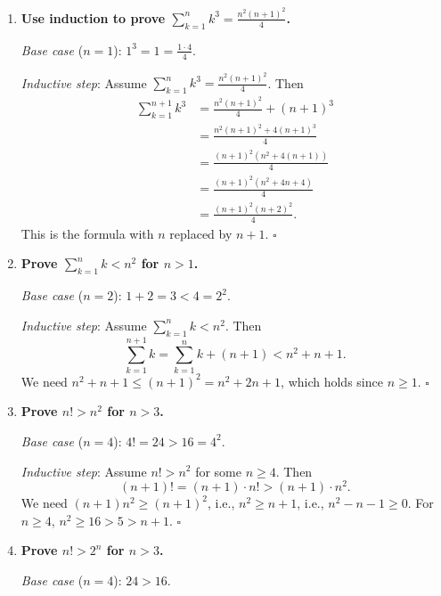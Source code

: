 \documentclass[11pt]{book}
\def\NN{\mathbb{N}}
\begin{document}
\begin{enumerate}[{0.}1. ]
\begin{enumerate}
\item $\NN$ and $\{a,b,c\}$: No bijection exists, since $\NN$ is infinite and $\{a,b,c\}$ has only 3 elements.
\end{enumerate}

\item \textbf{Use induction to prove $\sum_{k=1}^n k^3 = \frac{n^2(n+1)^2}{4}$.}

\textit{Base case} ($n=1$): $1^3 = 1 = \frac{1\cdot 4}{4}$. \checkmark

\textit{Inductive step}: Assume $\sum_{k=1}^n k^3 = \frac{n^2(n+1)^2}{4}$. Then
\begin{align*}
\sum_{k=1}^{n+1} k^3 &= \frac{n^2(n+1)^2}{4} + (n+1)^3\\
&= \frac{n^2(n+1)^2 + 4(n+1)^3}{4}\\
&= \frac{(n+1)^2(n^2 + 4(n+1))}{4}\\
&= \frac{(n+1)^2(n^2+4n+4)}{4}\\
&= \frac{(n+1)^2(n+2)^2}{4}.
\end{align*}
This is the formula with $n$ replaced by $n+1$. $\square$

\item \textbf{Prove $\sum_{k=1}^n k < n^2$ for $n > 1$.}

\textit{Base case} ($n=2$): $1+2=3 < 4=2^2$. \checkmark

\textit{Inductive step}: Assume $\sum_{k=1}^n k < n^2$. Then
\[
\sum_{k=1}^{n+1} k = \sum_{k=1}^n k + (n+1) < n^2 + n + 1.
\]
We need $n^2 + n + 1 \leq (n+1)^2 = n^2+2n+1$, which holds since $n \geq 1$. $\square$

\item \textbf{Prove $n! > n^2$ for $n > 3$.}

\textit{Base case} ($n=4$): $4! = 24 > 16 = 4^2$. \checkmark

\textit{Inductive step}: Assume $n! > n^2$ for some $n \geq 4$. Then
\[
(n+1)! = (n+1)\cdot n! > (n+1)\cdot n^2.
\]
We need $(n+1)n^2 \geq (n+1)^2$, i.e., $n^2 \geq n+1$, i.e., $n^2 - n - 1 \geq 0$. For $n \geq 4$, $n^2 \geq 16 > 5 > n+1$. $\square$

\item \textbf{Prove $n! > 2^n$ for $n > 3$.}

\textit{Base case} ($n=4$): $24 > 16$. \checkmark


\end{enumerate}
\end{document}
